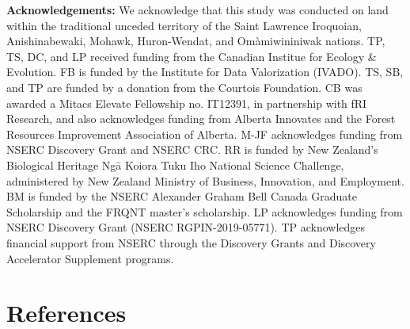\documentclass[10pt,oneside]{article}
\begin{document}
\textbf{Acknowledgements:} We acknowledge that this study was conducted
on land within the traditional unceded territory of the Saint Lawrence
Iroquoian, Anishinabewaki, Mohawk, Huron-Wendat, and Omàmiwininiwak
nations. TP, TS, DC, and LP received funding from the Canadian Institue
for Ecology \& Evolution. FB is funded by the Institute for Data
Valorization (IVADO). TS, SB, and TP are funded by a donation from the
Courtois Foundation. CB was awarded a Mitacs Elevate Fellowship no.
IT12391, in partnership with fRI Research, and also acknowledges funding
from Alberta Innovates and the Forest Resources Improvement Association
of Alberta. M-JF acknowledges funding from NSERC Discovery Grant and
NSERC CRC. RR is funded by New Zealand's Biological Heritage Ngā Koiora
Tuku Iho National Science Challenge, administered by New Zealand
Ministry of Business, Innovation, and Employment. BM is funded by the
NSERC Alexander Graham Bell Canada Graduate Scholarship and the FRQNT
master's scholarship. LP acknowledges funding from NSERC Discovery Grant
(NSERC RGPIN-2019-05771). TP acknowledges financial support from NSERC
through the Discovery Grants and Discovery Accelerator Supplement
programs.

\hypertarget{references}{%
\section*{References}\label{references}}
\end{document}
